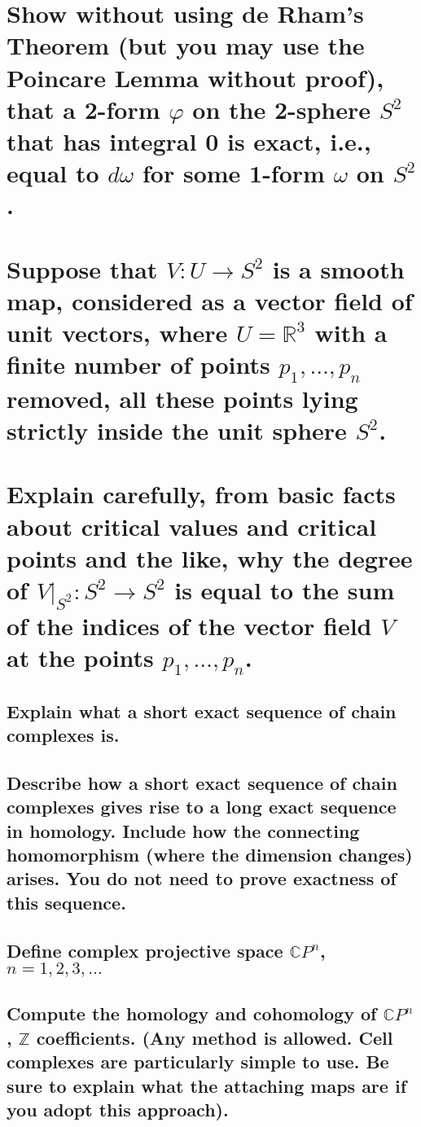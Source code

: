 \documentclass[10pt]{article}
\newcommand{\advsection}{\addtocounter{section}{1} \setcounter{subsection}{0}}
\begin{document}
\section{Show without using de Rham's Theorem (but you may use the Poincare Lemma without proof),
  that a 2-form $\varphi$ on the 2-sphere $S^2$ that has integral 0 is exact, i.e., equal to $d
  \omega$ for some 1-form $\omega$ on $S^2$.}

\section{Suppose that $V: U \to S^2$ is a smooth map, considered as a vector field of unit vectors,
  where $U = \mathbb{R}^3 $ with a finite number of points $p_1, \dots, p_n$ removed, all these
  points lying strictly inside the unit sphere $S^2$. \\\\ Explain carefully, from basic facts about
  critical values and critical points and the like, why the degree of $V|_{S^2} : S^2 \to S^2$ is
  equal to the sum of the indices of the vector field $V$ at the points $p_1, \dots, p_n$.}

\advsection{}

\subsection{Explain what a short exact sequence of chain complexes is.}

\subsection{Describe how a short exact sequence of chain complexes gives rise to a long exact
  sequence in homology. Include how the connecting homomorphism (where the dimension changes)
  arises. You do not need to prove exactness of this sequence.}

\advsection{}

\subsection{Define complex projective space $\mathbb{C} P^n$, $n = 1,2,3, \dots$}

\subsection{Compute the homology and cohomology of $\mathbb{C} P^n$, $\mathbb{Z}$ coefficients. (Any
  method is allowed. Cell complexes are particularly simple to use. Be sure to explain what the
  attaching maps are if you adopt this approach).}
\end{document}

